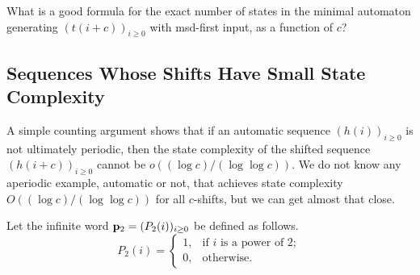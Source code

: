 \documentclass[12pt,reqno]{article}
\begin{document}
\begin{openproblem}
What is a good formula for the exact number of states in the minimal automaton generating $(t(i+c))_{i \geq 0}$ with msd-first input, as a function of $c$?
\end{openproblem}

\subsection{Sequences Whose Shifts Have Small State Complexity}

A simple counting argument shows that if an automatic sequence $(h(i))_{i \geq 0}$ is not ultimately periodic, then the state complexity of the shifted sequence $(h(i+c))_{i \geq 0}$ cannot be $o((\log c)/(\log \log c))$.  We do not know any aperiodic example, automatic or not, that achieves state complexity $O((\log c)/(\log \log c))$ for all $c$-shifts, but we can get almost that close.

Let the infinite word ${\bf p}_2 = (P_2(i))_{i \geq 0}$ be defined as follows.
\[
P_2(i) = 
\begin{cases}
    1, & \text{if $i$ is a power of $2$}; \\
    0, & \text{otherwise.}
\end{cases}
\]
\end{document}

